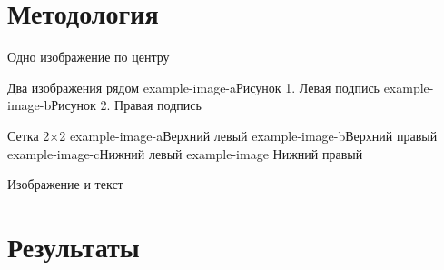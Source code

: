\documentclass[aspectratio=169,12pt,t]{beamer}
\begin{document}

\section{Методология}

\begin{frame}{Одно изображение по центру}
\end{frame}

\begin{frame}{Два изображения рядом}
  \twoimages
    {example-image-a}{Рисунок 1. Левая подпись}
    {example-image-b}{Рисунок 2. Правая подпись}
\end{frame}

\begin{frame}{Сетка 2×2}
  \fourgrid
    {example-image-a}{Верхний левый}
    {example-image-b}{Верхний правый}
    {example-image-c}{Нижний левый}
    {example-image}  {Нижний правый}
\end{frame}

\begin{frame}{Изображение и текст}
\end{frame}


\section{Результаты}
\end{document}
